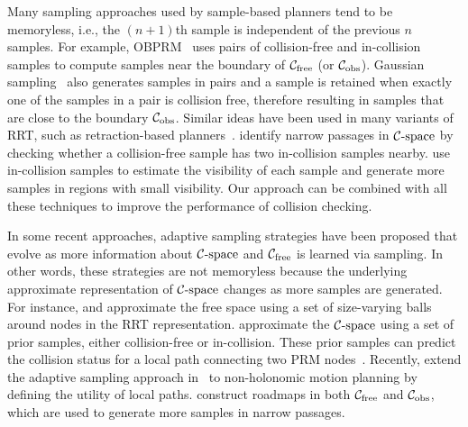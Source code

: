 Many sampling approaches used by sample-based planners tend to be memoryless, i.e., the $(n+1)$th sample is independent of the previous $n$ samples. For example,
OBPRM~\cite{Amato:1998:OOP} uses pairs of collision-free and in-collision samples to compute samples near the boundary of $\mathcal C_{\text{free}}$ (or $\mathcal C_{\text{obs}}$).
Gaussian sampling~\cite{Boor:1999:ICRA} also generates samples in pairs and a sample is retained when exactly one of the samples in a pair is collision free, therefore resulting in samples that are close to the boundary $\mathcal C_{\text{obs}}$. Similar ideas have been used in many variants of RRT, such as retraction-based planners~\cite{Hsu:1998:FNP,Rodriguez:2006,Zhang:2008:ICRA}. \cite{Zheng:2005} identify narrow passages in $\mathcal C\text{-space}$ by checking whether a collision-free sample has two in-collision samples nearby. \cite{Kavraki96} use in-collision samples to estimate the visibility of each sample and generate more samples in regions with small visibility. Our approach can be combined with all these techniques to improve the performance of collision checking.

In some recent approaches, adaptive sampling strategies have been proposed that evolve as more information about $\mathcal C\text{-space}$ and $\mathcal C_{\text{free}}$ is learned via sampling. In other words, these strategies are not memoryless because the underlying approximate representation of $\mathcal C\text{-space}$ changes as more samples are generated. For instance, \cite{Jaillet:2005:IROS} and \cite{Yershova:2005:ICRA} approximate the free space using a set of size-varying balls around nodes in the RRT representation. \cite{Burns-RSS-05} approximate the $\mathcal C\text{-space}$ using a set of prior samples, either collision-free or in-collision. These prior samples can predict the collision status for a local path connecting two PRM nodes~\cite{Burns:2005:ICRA}. Recently, \cite{Knepper:2012:IJRR} extend the adaptive sampling approach in~\cite{Burns-RSS-05} to non-holonomic motion planning by defining the utility of local paths. \cite{Jory:2011:IROS} construct roadmaps in both $\mathcal C_{\text{free}}$ and $\mathcal C_{\text{obs}}$, which are used to generate more samples in narrow passages.


